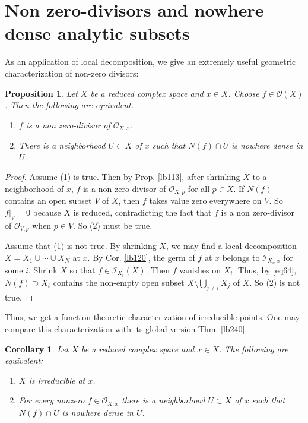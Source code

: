 \documentclass[12pt,b5paper,notitlepage]{report}
\theoremstyle{definition}
\theoremstyle{plain}
\newtheorem{pp}[df]{Proposition}
\newtheorem{co}[df]{Corollary}
\newcommand{\scr}{\mathscr}
\numberwithin{equation}{section}
\begin{document}
\section{Non zero-divisors and nowhere dense analytic subsets}\label{lb126}


As an application of local decomposition, we give an extremely useful geometric characterization of non-zero divisors:





\begin{pp}\label{lb121}
Let $X$ be a reduced complex space and $x\in X$. Choose $f\in\scr O(X)$. Then the following are equivalent. 
\begin{enumerate}[label=(\arabic*)]
\item $f$ is a non zero-divisor of $\scr O_{X,x}$.
\item There is a neighborhood $U\subset X$ of $x$ such that $N(f)\cap U$ is nowhere dense in $U$.
\end{enumerate}
\end{pp}

\begin{proof}
Assume (1) is true. Then by Prop. \ref{lb113}, after shrinking $X$ to a neighborhood of $x$, $f$ is a non-zero divisor of $\scr O_{X,p}$ for all $p\in X$. If $N(f)$ contains an open subset $V$ of $X$, then $f$ takes value zero everywhere on $V$. So $f|_V=0$ because $X$ is reduced, contradicting the fact that $f$ is a non zero-divisor of $\scr O_{V,p}$ when $p\in V$.  So (2) must be true.

Assume that (1) is not true. By shrinking $X$, we may find a local decomposition $X=X_1\cup\cdots\cup X_N$ at $x$. By Cor. \ref{lb120}, the germ of $f$ at $x$ belongs to $\scr I_{X_i,x}$ for some $i$. Shrink $X$ so that $f\in\scr I_{X_i}(X)$. Then $f$ vanishes on $X_i$. Thus, by \eqref{eq64}, $N(f)\supset X_i$ contains the non-empty open subset $X\setminus \bigcup_{j\neq i}X_j$ of $X$. So (2) is not true.
\end{proof}

Thus, we get a function-theoretic characterization of irreducible points. One may compare this characterization with its global version Thm. \ref{lb240}.

\begin{co}\label{lb369}
Let $X$ be a reduced complex space and $x\in X$. The following are equivalent:
\begin{enumerate}[label=(\arabic*)]
\item $X$ is irreducible at $x$.
\item For every nonzero $f\in\scr O_{X,x}$ there is a neighborhood $U\subset X$ of $x$ such that $N(f)\cap U$ is nowhere dense in $U$.
\end{enumerate}
\end{co}
\end{document}
